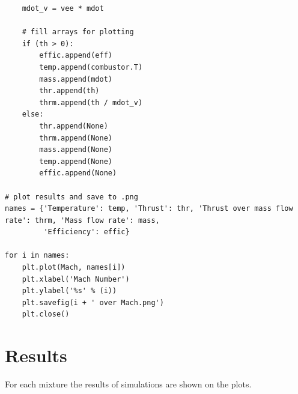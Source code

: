 \documentclass[a4paper,11pt]{article}
\begin{document}
\begin{lstlisting}
    mdot_v = vee * mdot

    # fill arrays for plotting
    if (th > 0):
        effic.append(eff)
        temp.append(combustor.T)
        mass.append(mdot)
        thr.append(th)
        thrm.append(th / mdot_v)
    else:
        thr.append(None)
        thrm.append(None)
        mass.append(None)
        temp.append(None)
        effic.append(None)

# plot results and save to .png
names = {'Temperature': temp, 'Thrust': thr, 'Thrust over mass flow rate': thrm, 'Mass flow rate': mass,
         'Efficiency': effic}

for i in names:
    plt.plot(Mach, names[i])
    plt.xlabel('Mach Number')
    plt.ylabel('%s' % (i))
    plt.savefig(i + ' over Mach.png')
    plt.close()

\end{lstlisting}
\newpage


\section{Results}
For each mixture the results of simulations are shown on the plots. 
\end{document}
